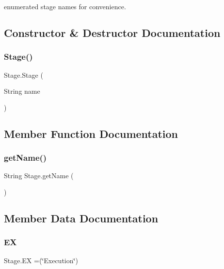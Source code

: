 enumerated stage names for convenience. 

\subsection{Constructor \& Destructor Documentation}
\mbox{\label{enum_stage_a257d36473edc4c48949d9ad372ac078b}} 
\subsubsection{\texorpdfstring{Stage()}{Stage()}}
{\footnotesize\ttfamily Stage.\+Stage (\begin{DoxyParamCaption}\item[{String}]{name }\end{DoxyParamCaption})}



\subsection{Member Function Documentation}
\mbox{\label{enum_stage_aed7fc998a53b35079ed2ff1aef363ec5}} 
\subsubsection{\texorpdfstring{get\+Name()}{getName()}}
{\footnotesize\ttfamily String Stage.\+get\+Name (\begin{DoxyParamCaption}{ }\end{DoxyParamCaption})}



\subsection{Member Data Documentation}
\mbox{\label{enum_stage_aeda45a1236f43fc0e106bb52ea327611}} 
\subsubsection{\texorpdfstring{EX}{EX}}
{\footnotesize\ttfamily Stage.\+EX =(\char`\"{}Execution\char`\"{})}

\mbox{\label{enum_stage_a90caf5b774c79ea44ca5633fd8206453}} 
